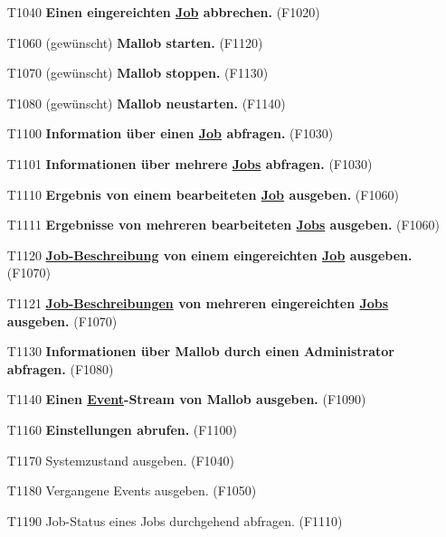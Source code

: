 \begin{itemize}
    \item[T1040] \textbf{Einen eingereichten \hyperref[B:Jobs]{Job} abbrechen.} (F1020)
    
    \item[T1060] (gewünscht) \textbf{Mallob starten.} (F1120)
    
    \item[T1070] (gewünscht) \textbf{Mallob stoppen.} (F1130)
    
    \item[T1080] (gewünscht) \textbf{Mallob neustarten.} (F1140)
    
    \item[T1100] \textbf{Information über einen \hyperref[B:Jobs]{Job} abfragen.} (F1030)
    
    \item[T1101] \textbf{Informationen über mehrere \hyperref[B:Jobs]{Jobs} abfragen.} (F1030)
    
    \item[T1110] \textbf{Ergebnis von einem bearbeiteten \hyperref[B:Jobs]{Job} ausgeben.} (F1060)
    
    \item[T1111] \textbf{Ergebnisse von mehreren bearbeiteten \hyperref[B:Jobs]{Jobs} ausgeben.} (F1060)
    
    \item[T1120] \textbf{\hyperref[B:Job-Beschreibung]{Job-Beschreibung} von einem eingereichten \hyperref[B:Jobs]{Job} ausgeben.} (F1070)
    
    \item[T1121] \textbf{\hyperref[B:Job-Beschreibung]{Job-Beschreibungen} von mehreren eingereichten \hyperref[B:Jobs]{Jobs} ausgeben.} (F1070)
    
    \item[T1130] \textbf{Informationen über Mallob durch einen \gls{Administrator} abfragen.} (F1080)
    
    \item[T1140] \textbf{Einen \hyperref[B:Event]{Event}-\gls{Stream} von Mallob ausgeben.} (F1090)
    
    
    \item[T1160] \textbf{Einstellungen abrufen.} (F1100)
    
    \item[T1170] Systemzustand ausgeben. (F1040)
    
    \item[T1180] Vergangene Events ausgeben. (F1050)
    
    \item[T1190] Job-Status eines Jobs durchgehend abfragen. (F1110)
    
    

\end{itemize}

